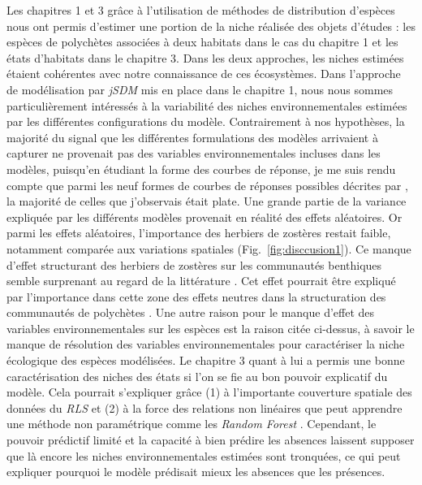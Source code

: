 \begin{refsection}
Les chapitres 1 et 3 grâce à l'utilisation de méthodes de distribution
d'espèces nous ont permis d'estimer une portion de la niche réalisée des
objets d'études : les espèces de polychètes associées à deux habitats
dans le cas du chapitre 1 et les états d'habitats dans le chapitre 3.
Dans les deux approches, les niches estimées étaient cohérentes avec
notre connaissance de ces écosystèmes. Dans l'approche de modélisation
par \emph{jSDM} mis en place dans le chapitre 1, nous nous sommes
particulièrement intéressés à la variabilité des niches
environnementales estimées par les différentes configurations du modèle.
Contrairement à nos hypothèses, la majorité du signal que les
différentes formulations des modèles arrivaient à capturer ne provenait
pas des variables environnementales incluses dans les modèles, puisqu'en
étudiant la forme des courbes de réponse, je me suis rendu compte que
parmi les neuf formes de courbes de réponses possibles décrites par
\textcite{Rigal_2020}, la majorité de celles que j'observais était
plate. Une grande partie de la variance expliquée par les différents
modèles provenait en réalité des effets aléatoires. Or parmi les effets
aléatoires, l'importance des herbiers de zostères restait faible,
notamment comparée aux variations spatiales
(Fig.~\ref{fig:disccusion1}). Ce manque d'effet structurant des herbiers
de zostères sur les communautés benthiques semble surprenant au regard
de la littérature \autocite{Bostrom_2006}. Cet effet pourrait être
expliqué par l'importance dans cette zone des effets neutres dans la
structuration des communautés de polychètes \autocite{Boye_2019a}. Une
autre raison pour le manque d'effet des variables environnementales sur
les espèces est la raison citée ci-dessus, à savoir le manque de
résolution des variables environnementales pour caractériser la niche
écologique des espèces modélisées. Le chapitre 3 quant à lui a permis
une bonne caractérisation des niches des états si l'on se fie au bon
pouvoir explicatif du modèle. Cela pourrait s'expliquer grâce (1) à
l'importante couverture spatiale des données du \emph{RLS} et (2) à la
force des relations non linéaires que peut apprendre une méthode non
paramétrique comme les \emph{Random Forest} \autocites[
]{Vayssieres_2000}{Valavi_2021}. Cependant, le pouvoir prédictif limité
et la capacité à bien prédire les absences laissent supposer que là
encore les niches environnementales estimées sont tronquées, ce qui peut
expliquer pourquoi le modèle prédisait mieux les absences que les
présences.


\end{refsection}
